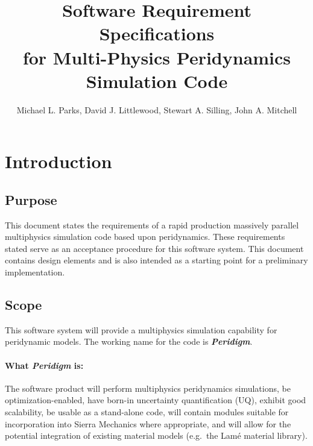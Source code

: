 \documentclass[10pt]{article}
\title{Software Requirement Specifications \\for Multi-Physics Peridynamics Simulation Code}
\author{Michael L. Parks, David J. Littlewood, Stewart A. Silling, John A. Mitchell}
\theoremstyle{plain}
\theoremstyle{definition}
\begin{document}
\maketitle


\section{Introduction} \label{sec:Introduction}

\subsection{Purpose}

This document states the requirements of a rapid production massively parallel multiphysics simulation code based upon peridynamics. These requirements stated serve as an acceptance procedure for this software system. This document contains design elements and is also intended as a starting point for a preliminary implementation.

\subsection{Scope}

This software system will provide a multiphysics simulation capability for peridynamic models. The working name for the code is \emph{\textbf{Peridigm}}.

\paragraph{What \emph{Peridigm} is:}

The software product will perform multiphysics peridynamics simulations, be optimization-enabled, have born-in uncertainty quantification (UQ), exhibit good scalability, be usable as a stand-alone code, will contain modules suitable for incorporation into Sierra Mechanics where appropriate, and will allow for the potential integration of existing material models (e.g.~the Lam\'{e} material library).
\end{document}
